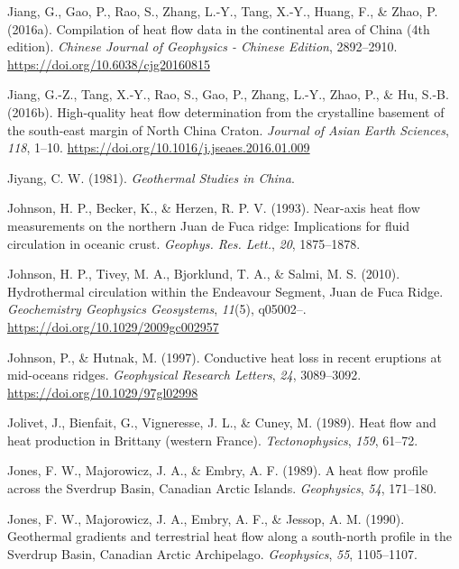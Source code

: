 \begin{CSLReferences}{1}{1}
\leavevmode{}%
Jiang, G., Gao, P., Rao, S., Zhang, L.-Y., Tang, X.-Y., Huang, F., \& Zhao, P. (2016a). Compilation of heat flow data in the continental area of {China} (4th edition). \emph{Chinese Journal of Geophysics - Chinese Edition}, 2892--2910. \url{https://doi.org/10.6038/cjg20160815}

\leavevmode{}%
Jiang, G.-Z., Tang, X.-Y., Rao, S., Gao, P., Zhang, L.-Y., Zhao, P., \& Hu, S.-B. (2016b). High-quality heat flow determination from the crystalline basement of the south-east margin of {North China Craton}. \emph{Journal of Asian Earth Sciences}, \emph{118}, 1--10. \url{https://doi.org/10.1016/j.jseaes.2016.01.009}

\leavevmode{}%
Jiyang, C. W. (1981). \emph{Geothermal Studies in China}.

\leavevmode{}%
Johnson, H. P., Becker, K., \& Herzen, R. P. V. (1993). Near-axis heat flow measurements on the northern {Juan de Fuca} ridge: Implications for fluid circulation in oceanic crust. \emph{Geophys. Res. Lett.}, \emph{20}, 1875--1878.

\leavevmode{}%
Johnson, H. P., Tivey, M. A., Bjorklund, T. A., \& Salmi, M. S. (2010). Hydrothermal circulation within the {Endeavour Segment, Juan de Fuca Ridge}. \emph{Geochemistry Geophysics Geosystems}, \emph{11}(5), q05002--. \url{https://doi.org/10.1029/2009gc002957}

\leavevmode{}%
Johnson, P., \& Hutnak, M. (1997). Conductive heat loss in recent eruptions at mid-oceans ridges. \emph{Geophysical Research Letters}, \emph{24}, 3089--3092. \url{https://doi.org/10.1029/97gl02998}

\leavevmode{}%
Jolivet, J., Bienfait, G., Vigneresse, J. L., \& Cuney, M. (1989). Heat flow and heat production in {Brittany (western France)}. \emph{Tectonophysics}, \emph{159}, 61--72.

\leavevmode{}%
Jones, F. W., Majorowicz, J. A., \& Embry, A. F. (1989). A heat flow profile across the {Sverdrup Basin}, {Canadian Arctic Islands}. \emph{Geophysics}, \emph{54}, 171--180.

\leavevmode{}%
Jones, F. W., Majorowicz, J. A., Embry, A. F., \& Jessop, A. M. (1990). Geothermal gradients and terrestrial heat flow along a south-north profile in the {Sverdrup Basin, Canadian Arctic Archipelago}. \emph{Geophysics}, \emph{55}, 1105--1107.


\end{CSLReferences}
